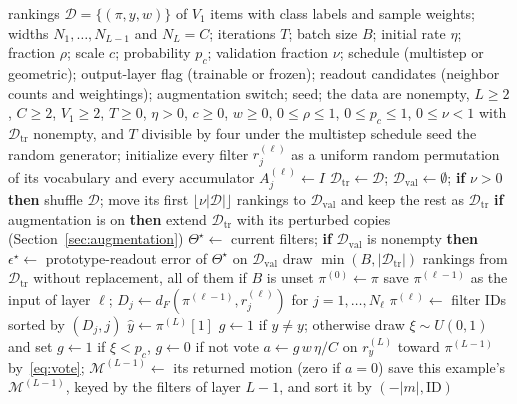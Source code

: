 \begin{algorithm}[!htbp]
\scriptsize
\caption{Training one ArrowFlow network and fitting its readout}
\label{alg:training}
\begin{algorithmic}[1]
\Require rankings $\mathcal{D}=\{(\pi,y,w)\}$ of $V_1$ items with class labels and sample weights; widths $N_1,\dots,N_{L-1}$ and $N_L=C$; iterations $T$; batch size $B$; initial rate $\eta$; fraction $\rho$; scale $c$; probability $p_c$; validation fraction $\nu$; schedule (multistep or geometric); output-layer flag (trainable or frozen); readout candidates (neighbor counts and weightings); augmentation switch; seed; the data are nonempty, $L\ge2$, $C\ge2$, $V_1\ge2$, $T\ge0$, $\eta>0$, $c\ge0$, $w\ge0$, $0\le\rho\le1$, $0\le p_c\le1$, $0\le\nu<1$ with $\mathcal{D}_{\mathrm{tr}}$ nonempty, and $T$ divisible by four under the multistep schedule
\State seed the random generator; initialize every filter $r^{(\ell)}_j$ as a uniform random permutation of its vocabulary and every accumulator $A^{(\ell)}_j\gets I$
\State $\mathcal{D}_{\mathrm{tr}}\gets\mathcal{D}$; $\mathcal{D}_{\mathrm{val}}\gets\emptyset$; \textbf{if} $\nu>0$ \textbf{then} shuffle $\mathcal{D}$; move its first $\lfloor\nu|\mathcal{D}|\rfloor$ rankings to $\mathcal{D}_{\mathrm{val}}$ and keep the rest as $\mathcal{D}_{\mathrm{tr}}$
\State \textbf{if} augmentation is on \textbf{then} extend $\mathcal{D}_{\mathrm{tr}}$ with its perturbed copies (Section~\ref{sec:augmentation})
\State $\Theta^\star\gets$ current filters; \textbf{if} $\mathcal{D}_{\mathrm{val}}$ is nonempty \textbf{then} $\epsilon^\star\gets$ prototype-readout error of $\Theta^\star$ on $\mathcal{D}_{\mathrm{val}}$ 
  \State draw $\min(B,|\mathcal{D}_{\mathrm{tr}}|)$ rankings from $\mathcal{D}_{\mathrm{tr}}$ without replacement, all of them if $B$ is unset 
   
    \State $\pi^{(0)}\gets\pi$
      \State save $\pi^{(\ell-1)}$ as the input of layer $\ell$; $D_j\gets d_F(\pi^{(\ell-1)},r^{(\ell)}_j)$ for $j=1,\dots,N_\ell$
      \State $\pi^{(\ell)}\gets$ filter IDs sorted by $(D_j,j)$
    \EndFor
    \State $\hat y\gets\pi^{(L)}[1]$ 
    \State $g\gets1$ if $\hat y\ne y$; otherwise draw $\xi\sim U(0,1)$ and set $g\gets1$ if $\xi<p_c$, $g\gets0$ if not 
    \State vote $a\gets g\,w\,\eta/C$ on $r^{(L)}_y$ toward $\pi^{(L-1)}$ by~\eqref{eq:vote}; $\mathcal{M}^{(L-1)}\gets$ its returned motion (zero if $a=0$)
    \State save this example's $\mathcal{M}^{(L-1)}$, keyed by the filters of layer $L-1$, and sort it by $(-|m|,\mathrm{ID})$ 

\end{algorithmic}
\end{algorithm}
